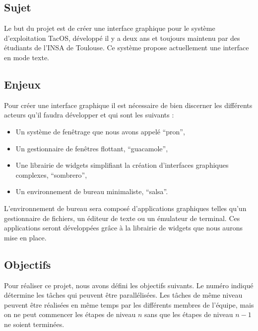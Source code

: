 \subsection{Sujet}
Le but du projet est de créer une interface graphique pour le système d'exploitation TacOS, développé il y a deux ans et toujours maintenu par des étudiants de l'INSA de Toulouse. Ce système propose actuellement une interface en mode texte.

\subsection{Enjeux}
Pour créer une interface graphique il est nécessaire de bien discerner les différents acteurs qu'il faudra développer et qui sont les suivants :

\begin{itemize}
\renewcommand{\labelitemi}{$\bullet$}
\item Un système de fenêtrage que nous avons appelé ``pron'',
\item Un gestionnaire de fenêtres flottant, ``guacamole'',
\item Une librairie de widgets simplifiant la création d'interfaces graphiques complexes, ``sombrero'',
\item Un environnement de bureau minimaliste, ``salsa''.
\end{itemize}

\vspace{1em}

L'environnement de bureau sera composé d'applications graphiques telles qu'un gestionnaire de fichiers, un éditeur de texte ou un émulateur de terminal. Ces applications seront développées grâce à la librairie de widgets que nous aurons mise en place.

\subsection{Objectifs}
Pour réaliser ce projet, nous avons défini les objectifs suivants. Le numéro indiqué détermine les tâches qui peuvent être parallélisées. Les tâches de même niveau peuvent être réalisées en même temps par les différents membres de l'équipe, mais on ne peut commencer les étapes de niveau $n$ sans que les étapes de niveau $n-1$ ne soient terminées.

\vspace{0.5em}

